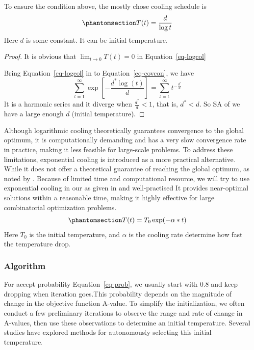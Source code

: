 \documentclass[
  a4paper,
  oneside,
  openany,
  12pt,
  onecolumn]{book}
\theoremstyle{definition}
\theoremstyle{plain}
\theoremstyle{remark}
\begin{document}
To ensure the condition above, the mostly chose cooling schedule is
\begin{equation}\phantomsection\label{eq-logcol}{
T(t) = \frac{d}{\log t}
}\end{equation} Here \(d\) is some constant. It can be initial
temperature.

\begin{proof}
It is obvious that \(\lim_{t\to 0} T(t)=0\) in Equation~\ref{eq-logcol}

Bring Equation~\ref{eq-logcol} in to Equation~\ref{eq-covcon}, we have
\[
\sum_{t=1}^{\infty} \exp[-\frac{d^*\log (t)}{d}]=\sum_{t=1}^{\infty}t^{-\frac{d^*}{d}}
\] It is a harmonic series and it diverge when \(\frac{d^*}{d}<1\), that
is, \(d^*<d\). So SA of we have a large enough \(d\) (initial
temperature).
\end{proof}

Although logarithmic cooling theoretically guarantees convergence to the
global optimum, it is computationally demanding and has a very slow
convergence rate in practice, making it less feasible for large-scale
problems. To address these limitations, exponential cooling is
introduced as a more practical alternative. While it does not offer a
theoretical guarantee of reaching the global optimum, as noted by
\citet{kirkpatrick1983optimization}. Because of limited time and
computational resource, we will try to use exponential cooling in our as
given in \citet{aarts1989simulated} and well-practised It provides
near-optimal solutions within a reasonable time, making it highly
effective for large combinatorial optimization problems.
\begin{equation}\phantomsection\label{eq-expcol}{
T(t) = T_0 \exp(-\alpha*t)
}\end{equation} Here \(T_0\) is the initial temperature, and \(\alpha\)
is the cooling rate determine how fast the temperature drop.

\subsubsection{Algorithm}\label{algorithm}

For accept probability Equation~\ref{eq-prob}, we usually start with
\(0.8\) and keep dropping when iteration goes.This probability depends
on the magnitude of change in the objective function A-value. To
simplify the initialization, we often conduct a few preliminary
iterations to observe the range and rate of change in A-values, then use
these observations to determine an initial temperature. Several studies
have explored methods for autonomously selecting this initial
temperature.
\end{document}
